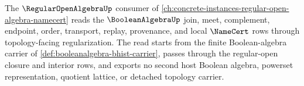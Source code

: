 The $\RegularOpenAlgebraUp$ consumer of \autoref{ch:concrete-instances-regular-open-algebra-namecert} reads the $\BooleanAlgebraUp$ join, meet, complement, endpoint, order, transport, replay, provenance, and local $\NameCert$ rows through topology-facing regularization. The read starts from the finite Boolean-algebra carrier of \autoref{def:booleanalgebra-bhist-carrier}, passes through the regular-open closure and interior rows, and exports no second host Boolean algebra, powerset representation, quotient lattice, or detached topology carrier.
